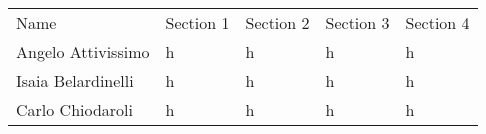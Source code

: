 \begin{center}
    \begin{tabu}{|X[1.5]|X|X|X|X|} \hline \everyrow{\hline}
        Name & Section 1 & Section 2 & Section 3 & Section 4 \\ 
        Angelo Attivissimo &  h &  h &  h &  h \\
        Isaia Belardinelli &  h &  h &  h &  h \\
        Carlo Chiodaroli &  h &  h &  h &  h \\ 
    \end{tabu}
\end{center}